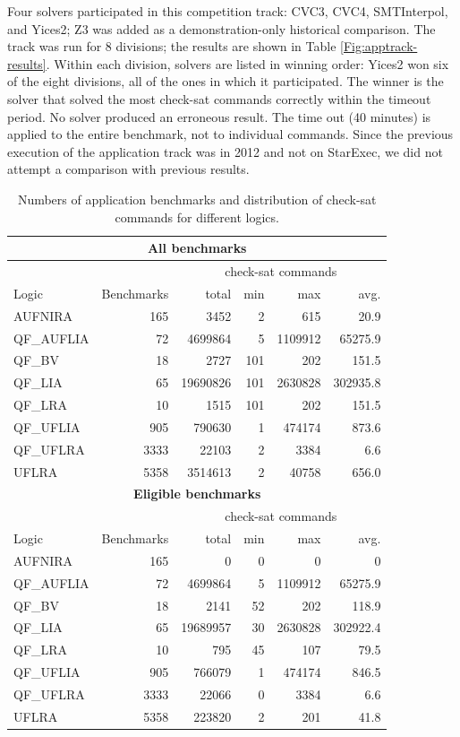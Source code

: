 \documentclass[twoside,11pt]{article}
\begin{document}
Four solvers participated in this competition track: CVC3, CVC4, SMTInterpol, and Yices2; Z3 was added as a demonstration-only historical comparison. The track was run for 8 divisions; the results are shown in Table \ref{Fig:apptrack-results}. Within each division, solvers are listed in winning order: Yices2 won six of the eight divisions, all of the ones in which it participated. The winner is the solver that solved the most check-sat commands correctly within the timeout period. No solver produced an erroneous result. The time out (40 minutes) is applied to the entire benchmark, not to individual commands. Since the previous execution of the application track was in 2012 and not on StarExec, we did not attempt a comparison with previous results.

\begin{table}
\centering
\begin{tabular}{|l|r|rrrr|}
\multicolumn{6}{c}{\textbf{All benchmarks}} \\
\hline
&  & \multicolumn{4}{c|}{check-sat commands} \\
 Logic & Benchmarks & total & min & max & avg. \\
\hline
AUFNIRA & 165  & 3452 & 2 & 615 & 20.9 \\
QF\_AUFLIA & 72 & 4699864 & 5 & 1109912 & 65275.9 \\
QF\_BV & 18 & 2727 & 101 & 202 & 151.5 \\
QF\_LIA & 65 & 19690826 & 101 & 2630828 & 302935.8 \\
QF\_LRA & 10 & 1515 & 101 & 202 & 151.5 \\
QF\_UFLIA & 905 & 790630 & 1 & 474174 & 873.6 \\
QF\_UFLRA & 3333 & 22103 & 2 & 3384 & 6.6 \\
UFLRA & 5358 & 3514613 & 2 & 40758 & 656.0 \\
\hline
\multicolumn{6}{c}{\textbf{Eligible benchmarks}} \\
\hline
&  & \multicolumn{4}{c|}{check-sat commands} \\
 Logic & Benchmarks & total & min & max & avg. \\
\hline
AUFNIRA & 165  & 0 & 0 & 0 & 0 \\
QF\_AUFLIA & 72 & 4699864 & 5 & 1109912 & 65275.9 \\
QF\_BV & 18 & 2141 & 52 & 202 & 118.9 \\
QF\_LIA & 65 & 19689957 & 30 & 2630828 & 302922.4 \\
QF\_LRA & 10 & 795 & 45 & 107 & 79.5 \\
QF\_UFLIA & 905 & 766079 & 1 & 474174 & 846.5 \\
QF\_UFLRA & 3333 & 22066 & 0 & 3384 & 6.6 \\
UFLRA & 5358 & 223820 & 2 & 201 & 41.8 \\
\hline
\end{tabular}
\caption{Numbers of application benchmarks and distribution of check-sat commands for different logics.}
\label{Fig:apptrack-benchmarks}
\end{table}
 
\end{document}
